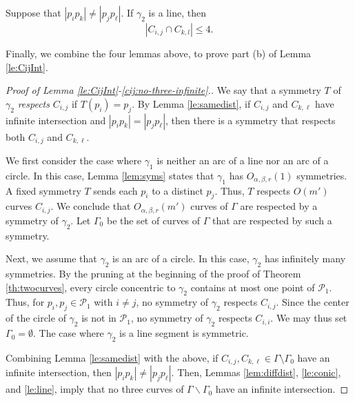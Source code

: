 \documentclass[11pt]{article}
\theoremstyle{definition}
\newcommand{\pts}{\mathcal{P}}
\newcommand{\curves}{\Gamma}
\begin{document}
\begin{lemma}\label{le:line}
 Suppose that $|p_ip_k| \neq |p_jp_\ell|$.
 If $\gamma_2$ is a line, then $$|C_{i,j}\cap C_{k,l}| \leq 4.$$
\end{lemma}

Finally, we combine the four lemmas above, to prove part (b) of Lemma \ref{le:CijInt}.

\begin{proof}[Proof of Lemma \ref{le:CijInt}-\ref{cij:no-three-infinite}.]
We say that a symmetry $T$ of $\gamma_2$ \emph{respects} $C_{i,j}$ if $T(p_i)=p_j$.
By Lemma \ref{le:samedist}, if $C_{i,j}$ and $C_{k,\ell}$ have infinite intersection and $|p_ip_k|=|p_jp_\ell|$, then there is a symmetry that respects both $C_{i,j}$ and $C_{k,\ell}$.

We first consider the case where $\gamma_1$ is neither an arc of a line nor an arc of a circle.
In this case, Lemma \ref{lem:syms} states that $\gamma_1$ has $O_{\alpha,\beta,r}(1)$ symmetries.
A fixed symmetry $T$ sends each $p_i$ to a distinct $p_j$.
Thus, $T$ respects $O(m')$ curves $C_{i,j}$.
We conclude that $O_{\alpha,\beta,r}(m')$ curves of $\curves$ are respected by a symmetry of $\gamma_2$.
Let $\curves_0$ be the set of curves of $\curves$ that are respected by such a symmetry.

Next, we assume that $\gamma_2$ is an arc of a circle.
In this case, $\gamma_2$ has infinitely many symmetries.
By the pruning at the beginning of the proof of Theorem \ref{th:twocurves}, every circle concentric to $\gamma_2$ contains at most one point of $\pts_1$. 
Thus, for $p_i,p_j \in \pts_1$ with $i\neq j$, no symmetry of $\gamma_2$ respects $C_{i,j}$.
Since the center of the circle of $\gamma_2$ is not in $\pts_1$, no symmetry of $\gamma_2$ respects $C_{i,i}$.
We may thus set $\curves_0=\emptyset$. 
The case where $\gamma_2$ is a line segment is symmetric.

Combining Lemma \ref{le:samedist} with the above, if $C_{i,j}, C_{k,\ell}\in \curves\setminus \curves_0$ have an infinite intersection, then $|p_ip_k|\neq|p_jp_\ell|$.
Then, Lemmas \ref{lem:diffdist}, \ref{le:conic}, and \ref{le:line}, imply that no three curves of $\curves\backslash \curves_0$ have an infinite intersection.
%
\end{proof}	




\end{document}
